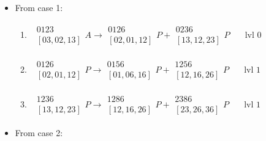 \documentclass[a4paper,12pt]{amsart}
\numberwithin{equation}{section}
\begin{document}
\begin{itemize}
	\item From case 1:
	\begin{enumerate}
		\item 
		$
		\begin{array}{cc}
			\begin{array}{c} 0123 \\ \left[03,02,13\right] \end{array}	A \rightarrow 
			\begin{array}{c} 0126 \\ \left[02,01,12\right] \end{array}	P +
			\begin{array}{c} 0236 \\ \left[13,12,23\right] \end{array}	P  					& \quad  \mbox{lvl 0}
		\end{array}
		$
		\item 
		$
		\begin{array}{cc}
			\begin{array}{c} 0126 \\ \left[02,01,12\right] \end{array}	P \rightarrow 
			\begin{array}{c} 0156 \\ \left[01,06,16\right] \end{array}	P +
			\begin{array}{c} 1256 \\ \left[12,16,26\right] \end{array}	P  					& \quad \mbox{lvl 1}
		\end{array}
		$
		\item 
		$
		\begin{array}{cc}
			\begin{array}{c} 1236 \\ \left[13,12,23\right] \end{array}	P \rightarrow 
			\begin{array}{c} 1286 \\ \left[12,16,26\right] \end{array}	P +
			\begin{array}{c} 2386 \\ \left[23,26,36\right] \end{array}	P  					& \quad  \mbox{lvl 1}
		\end{array}
		$
	\end{enumerate}
	\item From case 2:
	\begin{enumerate}

\end{enumerate}
\end{itemize}
\end{document}
